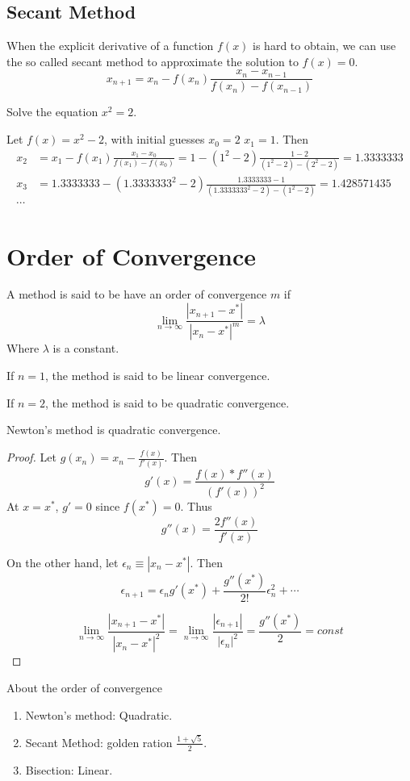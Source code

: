 \subsection*{Secant Method}
\begin{thm}
	When the explicit derivative of a function $f(x)$ is hard to obtain, we can use the so called secant method to approximate the solution to $f(x) = 0$. 
	\[ x_{n+1} = x_n - f(x_n)\frac{x_n - x_{n-1}}{f(x_n) - f(x_{n-1})} \]
\end{thm}

\begin{ex}
	Solve the equation $x^2 = 2$.
\end{ex}
\begin{solution}
	Let $f(x) = x^2 - 2$, with initial guesses $x_0 = 2$ $x_1 = 1$. Then
	\begin{align*}
	x_{2} &= x_1 - f(x_1)\frac{x_1 - x_{0}}{f(x_1) - f(x_{0})} = 1 - (1^2-2) \frac{1-2}{(1^2-2)- (2^2 - 2)} = 1.3333333\\
	x_3 &= 1.3333333 - (1.3333333^2 - 2)\frac{1.3333333 - 1}{(1.3333333^2 - 2) - (1^2 -2)} = 1.428571435\\
	\cdots 
	\end{align*}
\end{solution}

\section{Order of Convergence}
\begin{definition}
	A method is said to be have an order of convergence $m$ if 
	\[ \lim_{n\to\infty}\frac{|x_{n+1} - x^*|}{|x_n - x^*|^m} = \lambda \]
	Where $\lambda$ is a constant. 
	
	If $n=1$, the method is said to be linear convergence.
	
	If $n=2$, the method is said to be quadratic convergence.
\end{definition}

\begin{thm}
	Newton's method is quadratic convergence.
\end{thm}
\begin{proof}
	Let $g(x_n) = x_n - \frac{f(x)}{f'(x)}$. Then
	\[ g'(x) = \frac{f(x)*f''(x)}{(f'(x))^2} \]
	At $x=x^*$, $g' = 0$ since $f(x^*) = 0$. Thus 
	\[g''(x) = \frac{2f''(x)}{f'(x)} \]
	
	On the other hand, let $\epsilon_{n} \equiv |x_{n} - x^*|$. Then
	\[ \epsilon_{n+1} = \epsilon_{n}g'(x^*) + \frac{g''(x^*)}{2!}\epsilon_{n}^2 + \cdots \]
	
	\[ \lim_{n\to\infty} \frac{|x_{n+1} - x^*|}{|x_n - x^*|^2} = \lim_{n\to\infty}\frac{|\epsilon_{n+1}|}{|\epsilon_{n}|^2} = \frac{g''(x^*)}{2} = const \]
\end{proof}

\begin{summary}
	About the order of convergence
	\begin{enumerate}
		\item Newton's method: Quadratic.
		\item Secant Method: golden ration $\frac{1+\sqrt{5}}{2}$.
		\item  Bisection: Linear.
	\end{enumerate}
\end{summary}
